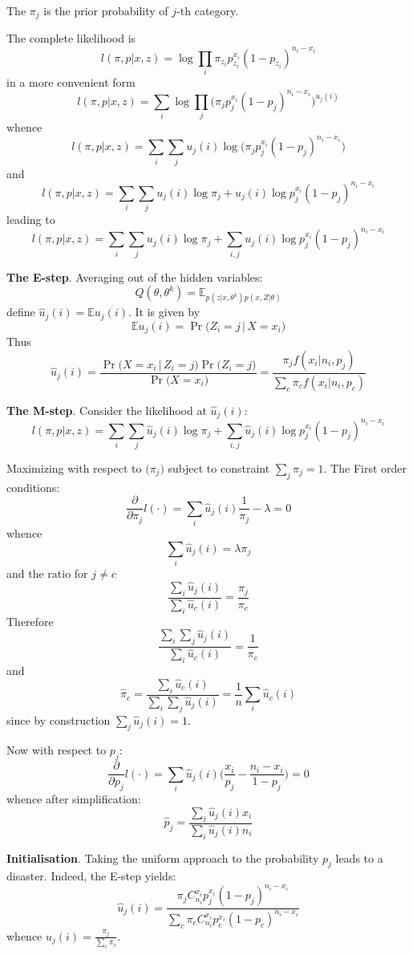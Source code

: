 \documentclass[a4paper]{article}
\newcommand{\ex}{\mathbb{E}}
\begin{document}
The $\pi_j$ is the prior probability of $j$-th category.

The complete likelihood is
\[l(\pi, p\lvert x, z) = \log \prod_i \pi_{z_i} p_{z_i}^{x_i}(1-p_{z_i})^{n_i-x_i}\]
in a more convenient form
\[l(\pi, p\lvert x, z) = \sum_i \log \prod_j \big(\pi_j p_j^{x_i}(1-p_j)^{n_i-x_i}\big)^{u_j(i)}\]
whence
\[l(\pi, p\lvert x, z) = \sum_i\sum_j u_j(i)\log \big(\pi_j p_j^{x_i}(1-p_j)^{n_i-x_i}\big)\]
and 
\[l(\pi, p\lvert x, z) = \sum_i \sum_j u_j(i)\log \pi_j + u_j(i)\log p_j^{x_i}(1-p_j)^{n_i-x_i}\]
leading to 
\[l(\pi, p\lvert x, z) = \sum_i \sum_j u_j(i)\log \pi_j + \sum_{i,j} u_j(i)\log p_j^{x_i}(1-p_j)^{n_i-x_i}\]

\textbf{The E-step}. Averaging out of the hidden variables:
\[Q(\theta, \theta^k) =  \ex_{p(z\lvert x, \theta^k) p(x,Z\lvert \theta)}\]
define $\hat{u}_j(i) = \ex u_j(i)$. It is given by 
\[\ex u_j(i) = \Pr\big(Z_i=j\,\lvert\,X=x_i\big)\]
Thus
\[\hat{u}_j(i) = \frac{\Pr\big(X=x_i\,\lvert\,Z_i=j\big)\Pr\big(Z_i=j\big)}{\Pr\big(X=x_i\big)}
= \frac{ \pi_j f(x_i\lvert n_i, p_j)}{\sum_c \pi_c f(x_i\lvert n_i, p_c)}\]

\textbf{The M-step}. Consider the likelihood at $\hat{u}_j(i)$:
\[l(\pi, p\lvert x, z) = \sum_i \sum_j \hat{u}_j(i)\log \pi_j + \sum_{i,j} \hat{u}_j(i)\log p_j^{x_i}(1-p_j)^{n_i-x_i}\]

Maximizing with respect to $\big(\pi_j\big)$ subject to constraint $\sum_j \pi_j = 1$. The First order conditions:
\[\frac{\partial}{\partial \pi_j} l(\cdot) = \sum_i \hat{u}_j(i)\frac{1}{\pi_j} - \lambda = 0\]
whence
\[\sum_i \hat{u}_j(i) = \lambda \pi_j\]
and the ratio for $j\neq c$
\[\frac{\sum_i \hat{u}_j(i)}{\sum_i \hat{u}_c(i)} = \frac{\pi_j}{\pi_c}\]
Therefore
\[\frac{\sum_i \sum_j \hat{u}_j(i)}{\sum_i \hat{u}_c(i)} = \frac{1}{\pi_c}\]
and 
\[\hat{\pi}_c = \frac{\sum_i \hat{u}_c(i)}{\sum_i \sum_j \hat{u}_j(i)} = \frac{1}{n}\sum_i \hat{u}_c(i)\]
since by construction $\sum_j \hat{u}_j(i)=1$.

Now with respect to $p_j$:
\[\frac{\partial}{\partial p_j} l(\cdot) = \sum_i \hat{u}_j(i) \Big(\frac{x_i}{p_j} - \frac{n_i-x_i}{1-p_j}\Big) = 0\]
whence after simplification:
\[\hat{p}_j = \frac{\sum_i \hat{u}_j(i) x_i }{\sum_i \hat{u}_j(i) n_i}\]

\textbf{Initialisation}. Taking the uniform approach to the probability $p_j$ leads to a disaster.
Indeed, the E-step yields:
\[\hat{u}_j(i) = \frac{ \pi_j C_{n_i}^{x_i} p_j^{x_i}(1-p_j)^{n_i - x_i}}{\sum_c \pi_c C_{n_i}^{x_i} p_c^{x_i}(1-p_c)^{n_i - x_i}}\]
whence $\hat{u}_j(i) = \frac{\pi_j}{\sum_c \pi_c}$.
\end{document}
